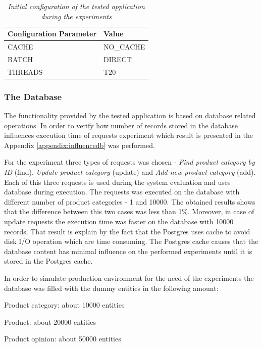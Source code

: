 \documentclass[12pt,a4paper]{article}
\let\tempone\itemize
\let\temptwo\enditemize
\renewenvironment{itemize}{\tempone\addtolength{\itemsep}{-0.4\baselineskip}}{\temptwo}
\begin{document}
\begin{table}[!htb]
\caption{\textit{Initial configuration of the tested application during the experiments}} \label{table:initconfiguration}
\begin{tabularx}{\textwidth}{X|X}
\textbf{Configuration Parameter} & \textbf{Value} \\ \hline
CACHE & NO\_CACHE \\ \hline
BATCH & DIRECT\\ \hline
THREADS & T20\\
\end{tabularx}
\end{table}

\subsubsection{The Database}

The functionality provided by the tested application is based on database related operations. In order to verify how number of records stored in the database influences execution time of requests experiment which result is presented in the Appendix \ref{appendix:influencedb} was performed. 

For the experiment three types of requests was chosen - \textit{Find product category by ID} (find), \textit{Update product category} (update) and \textit{Add new product category} (add). Each of this three requests is used during the system evaluation and uses database during execution. The requests was executed on the database with different number of product categories - 1 and 10000. The obtained results shows that the difference between this two cases was less than 1\%. Moreover, in case of update requests the execution time was faster on the database with 10000 records. That result is explain by the fact that the Postgres uses cache to avoid disk I/O operation which are time consuming. The Postgres cache causes that the database content has minimal influence on the performed experiments until it is stored in the Postgres cache. 

In order to simulate production environment for the need of the experiments the database was filled with the dummy entities in the following amount: 

\begin{itemize}
\item Product category: about 10000 entities
\item Product: about 20000 entities
\item Product opinion: about 50000 entities
\end{itemize}
\end{document}
